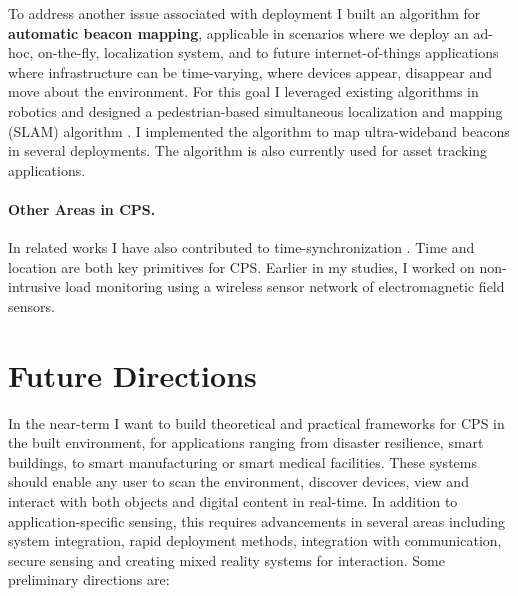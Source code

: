 \documentclass[10pt]{article}
\begin{document}
To address another issue associated with deployment I built an algorithm for {\bf automatic beacon mapping}, applicable in scenarios where we deploy an ad-hoc, on-the-fly, localization system, and  to future internet-of-things applications where infrastructure can be time-varying, where devices appear, disappear and move about the environment. %
For this goal I leveraged existing algorithms in robotics and designed a pedestrian-based simultaneous localization and mapping (SLAM) algorithm \cite{mobileAR}. I implemented the algorithm to map ultra-wideband beacons in several deployments. The algorithm is also currently used for asset tracking applications.


\paragraph{Other Areas in CPS. }
In related works I have also contributed to time-synchronization \cite{buevich2013hardware, dongare2017pulsar}. Time and location are both key primitives for CPS. 
Earlier in my studies, I worked on non-intrusive load monitoring \cite{rajagopal2013magnetic, rajagopal2013demo} using a wireless sensor network of electromagnetic field sensors. 

\section{Future Directions}

In the near-term I want to build theoretical and practical frameworks for CPS in the built environment, for applications ranging from disaster resilience, smart buildings, to smart manufacturing or smart medical facilities. These systems should enable any user to scan the environment, discover devices, view and interact with both objects and digital content in real-time. %
In addition to application-specific sensing, this requires advancements in several areas including system integration, rapid deployment methods, integration with communication, secure sensing and creating mixed reality systems for interaction. Some preliminary directions are:
\end{document}
